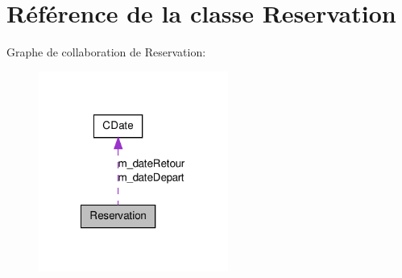 \hypertarget{class_reservation}{
\section{Référence de la classe Reservation}
\label{class_reservation}
}


Graphe de collaboration de Reservation:
\nopagebreak
\begin{figure}[H]
\begin{center}
\leavevmode
\includegraphics[width=176pt]{class_reservation__coll__graph}
\end{center}
\end{figure}
